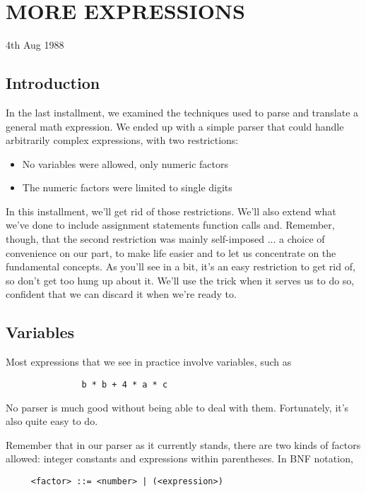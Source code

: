 
\chapter{MORE EXPRESSIONS}

4th Aug 1988

\section{Introduction}

In the last installment, we examined the techniques used to parse and  translate a general math expression. We  ended  up  with  a simple parser that  could handle arbitrarily complex expressions, with two restrictions:

\begin{itemize}
\item	No variables were allowed, only numeric factors
\item	The numeric factors were limited to single digits
\end{itemize}

In this installment, we'll get  rid of those restrictions. We'll also extend what  we've  done  to  include  assignment statements function  calls  and. Remember, though, that   the  second restriction was  mainly self-imposed  ... a choice of convenience on our part, to make life easier and to let us concentrate on the fundamental concepts. As  you'll  see  in  a bit, it's an easy restriction to get rid of, so don't get  too  hung  up  about it. We'll use the trick when it serves us to do so, confident that we can discard it when we're ready to.

\section{Variables}

Most expressions  that we see in practice involve variables, such as

\begin{verbatim}
               b * b + 4 * a * c
\end{verbatim}

No  parser is much good without being able  to  deal  with  them. Fortunately, it's also quite easy to do.

Remember that in our parser as it currently stands, there are two kinds of  factors  allowed:  integer  constants  and  expressions within parentheses. In BNF notation,

\begin{verbatim}
     <factor> ::= <number> | (<expression>)
\end{verbatim}

